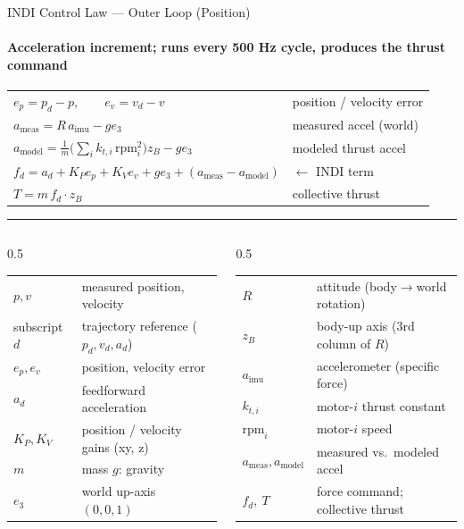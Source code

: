 \documentclass[aspectratio=169,11pt]{beamer}
\begin{document}
\begin{frame}{INDI Control Law --- Outer Loop (Position)}
\framesubtitle{Acceleration increment; runs every 500 Hz cycle, produces the thrust command}
\small
\renewcommand{\arraystretch}{1.4}
\begin{center}
\begin{tabular}{@{}l@{\hspace{1.2em}}l@{}}
\(e_p = p_d - p,\qquad e_v = v_d - v\) & \footnotesize position / velocity error \\
\(a_{\mathrm{meas}} = R\,a_{\mathrm{imu}} - g e_3\) & \footnotesize measured accel (world) \\
\(a_{\mathrm{model}} = \tfrac{1}{m}\big(\textstyle\sum_i k_{t,i}\,\mathrm{rpm}_i^2\big)z_B - g e_3\) & \footnotesize modeled thrust accel \\
\(f_d = a_d + K_P e_p + K_V e_v + g e_3 + (a_{\mathrm{meas}} - a_{\mathrm{model}})\) & \footnotesize \(\leftarrow\) INDI term \\
\(T = m\,f_d \cdot z_B\) & \footnotesize collective thrust \\
\end{tabular}
\end{center}
\vspace{0.15cm}\hrule\vspace{0.15cm}
{\scriptsize
\begin{columns}[t,totalwidth=\textwidth]
\begin{column}{0.5\textwidth}
\begin{tabular}{@{}ll@{}}
\(p,v\) & measured position, velocity \\
subscript \(d\) & trajectory reference (\(p_d,v_d,a_d\)) \\
\(e_p,e_v\) & position, velocity error \\
\(a_d\) & feedforward acceleration \\
\(K_P,K_V\) & position / velocity gains (xy, z) \\
\(m\) & mass \qquad \(g\): gravity \\
\(e_3\) & world up-axis \((0,0,1)\) \\
\end{tabular}
\end{column}
\begin{column}{0.5\textwidth}
\begin{tabular}{@{}ll@{}}
\(R\) & attitude (body\(\to\)world rotation) \\
\(z_B\) & body-up axis (3rd column of \(R\)) \\
\(a_{\mathrm{imu}}\) & accelerometer (specific force) \\
\(k_{t,i}\) & motor-\(i\) thrust constant \\
\(\mathrm{rpm}_i\) & motor-\(i\) speed \\
\(a_{\mathrm{meas}},a_{\mathrm{model}}\) & measured vs.\ modeled accel \\
\(f_d,\ T\) & force command; collective thrust \\
\end{tabular}
\end{column}
\end{columns}}
\end{frame}
\end{document}
